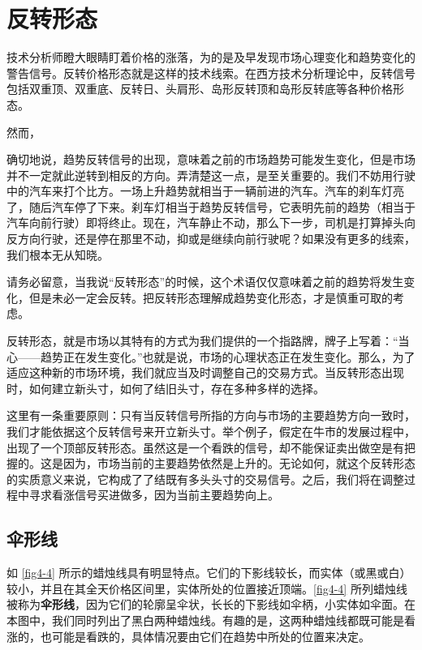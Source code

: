 \chapter{反转形态\label{ch04}}
技术分析师瞪大眼睛盯着价格的涨落，为的是及早发现市场心理变化和趋势变化的警告信号。反转价格形态就是这样的技术线索。在西方技术分析理论中，反转信号包括双重顶、双重底、反转日、头肩形、岛形反转顶和岛形反转底等各种价格形态。

然而，

确切地说，趋势反转信号的出现，意味着之前的市场趋势可能发生变化，但是市场并不一定就此逆转到相反的方向。弄清楚这一点，是至关重要的。我们不妨用行驶中的汽车来打个比方。一场上升趋势就相当于一辆前进的汽车。汽车的刹车灯亮了，随后汽车停了下来。刹车灯相当于趋势反转信号，它表明先前的趋势（相当于汽车向前行驶）即将终止。现在，汽车静止不动，那么下一步，司机是打算掉头向反方向行驶，还是停在那里不动，抑或是继续向前行驶呢？如果没有更多的线索，我们根本无从知晓。

\begin{tcolorbox}
    请务必留意，当我说“反转形态”的时候，这个术语仅仅意味着之前的趋势将发生变化，但是未必一定会反转。把反转形态理解成趋势变化形态，才是慎重可取的考虑。
\end{tcolorbox}

反转形态，就是市场以其特有的方式为我们提供的一个指路牌，牌子上写着：“当心——趋势正在发生变化。”也就是说，市场的心理状态正在发生变化。那么，为了适应这种新的市场环境，我们就应当及时调整自己的交易方式。当反转形态出现时，如何建立新头寸，如何了结旧头寸，存在多种多样的选择。

这里有一条重要原则：只有当反转信号所指的方向与市场的主要趋势方向一致时，我们才能依据这个反转信号来开立新头寸。举个例子，假定在牛市的发展过程中，出现了一个顶部反转形态。虽然这是一个看跌的信号，却不能保证卖出做空是有把握的。这是因为，市场当前的主要趋势依然是上升的。无论如何，就这个反转形态的实质意义来说，它构成了了结既有多头头寸的交易信号。之后，我们将在调整过程中寻求看涨信号买进做多，因为当前主要趋势向上。
\section{伞形线}
如 \autoref{fig4-4} 所示的蜡烛线具有明显特点。它们的下影线较长，而实体（或黑或白）较小，并且在其全天价格区间里，实体所处的位置接近顶端。\autoref{fig4-4} 所列蜡烛线被称为\textbf{伞形线}，因为它们的轮廓呈伞状，长长的下影线如伞柄，小实体如伞面。在本图中，我们同时列出了黑白两种蜡烛线。有趣的是，这两种蜡烛线都既可能是看涨的，也可能是看跌的，具体情况要由它们在趋势中所处的位置来决定。

